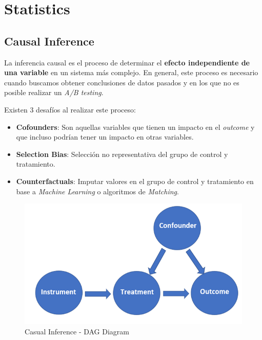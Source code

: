 \section{Statistics}

\subsection{Causal Inference}

La inferencia causal es el proceso de determinar el \textbf{efecto independiente de una variable} en un sistema más complejo. En general, este proceso es necesario cuando buscamos obtener conclusiones de datos pasados y en los que no es posible realizar un \textit{A/B testing}.

Existen 3 desafíos al realizar este proceso: 
\begin{itemize}
    \item \textbf{Cofounders}: Son aquellas variables que tienen un impacto en el \textit{outcome} y que incluso podrían tener un impacto en otras variables. 
    \item \textbf{Selection Bias}: Selección no representativa del grupo de control y tratamiento.
    \item \textbf{Counterfactuals}: Imputar valores en el grupo de control y tratamiento en base a \textit{Machine Learning} o algoritmos de \textit{Matching}. 
\end{itemize}

\begin{figure}[H]
    \center
    \includegraphics[scale=0.3]{notebooks/STATS/img/causal_inference_diagram.png}
    \caption{Casual Inference - DAG Diagram}
\end{figure}


